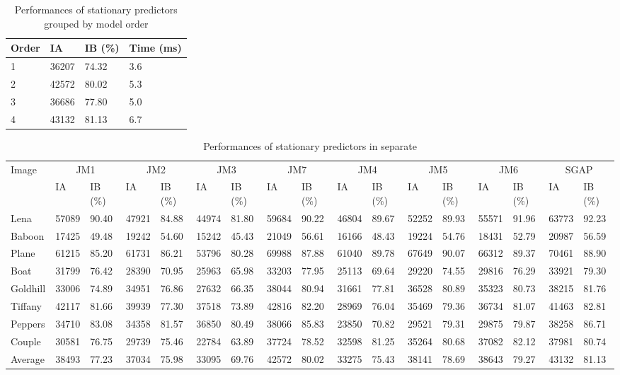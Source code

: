 \documentclass[journal]{IEEEtran}
\begin{document}
\begin{table}
    \caption{\label{tbl:spo}Performances of stationary predictors grouped by model order}
    \centering
    \begin{tabular}{llll}\hline\hline
	Order & IA & IB (\%) & Time (ms) \\\hline
	1 & 36207 & 74.32 & 3.6 \\
	2 & 42572 & 80.02 & 5.3 \\ 
	3 & 36686 & 77.80 & 5.0 \\
	4 & 43132 & 81.13 & 6.7 \\\hline\hline
    \end{tabular}
\end{table}

\begin{table*}
    \caption{\label{tbl:spt}Performances of stationary predictors in separate}
    \setlength{\tabcolsep}{1.5mm}
    \begin{tabular}{lllllllllllllllll}\hline\hline
	Image & \multicolumn{2}{c}{JM1} & \multicolumn{2}{c}{JM2} & \multicolumn{2}{c}{JM3} & \multicolumn{2}{c}{JM7} & \multicolumn{2}{c}{JM4} & \multicolumn{2}{c}{JM5} & \multicolumn{2}{c}{JM6} & \multicolumn{2}{c}{SGAP} \\\cline{2-17}
	& IA	&  IB (\%) 	& IA	& IB (\%)	& IA	& IB (\%)	& IA	& IB (\%)	& IA	& IB (\%)	& IA 	& IB (\%)	& IA	& IB (\%)	& IA 	& IB (\%) \\\hline
	Lena 	& 57089 & 90.40 & 47921 & 84.88 & 44974 & 81.80 & 59684 & 90.22 & 46804 & 89.67 & 52252 & 89.93 & 55571 & 91.96 & 63773 & 92.23 \\
 	Baboon 	& 17425 & 49.48 & 19242 & 54.60 & 15242 & 45.43 & 21049 & 56.61 & 16166 & 48.43 & 19224 & 54.76 & 18431 & 52.79 & 20987 & 56.59 \\
 	Plane	& 61215 & 85.20 & 61731 & 86.21 & 53796 & 80.28 & 69988 & 87.88 & 61040 & 89.78 & 67649 & 90.07 & 66312 & 89.37 & 70461 & 88.90 \\
 	Boat	& 31799 & 76.42 & 28390 & 70.95 & 25963 & 65.98 & 33203 & 77.95 & 25113 & 69.64 & 29220 & 74.55 & 29816 & 76.29 & 33921 & 79.30 \\
 	Goldhill& 33006 & 74.89 & 34951 & 76.86 & 27632 & 66.35 & 38044 & 80.94 & 31661 & 77.81 & 36528 & 80.89 & 35323 & 80.73 & 38215 & 81.76 \\
 	Tiffany	& 42117 & 81.66 & 39939 & 77.30 & 37518 & 73.89 & 42816 & 82.20 & 28969 & 76.04 & 35469 & 79.36 & 36734 & 81.07 & 41463 & 82.81 \\
 	Peppers	& 34710 & 83.08 & 34358 & 81.57 & 36850 & 80.49 & 38066 & 85.83 & 23850 & 70.82 & 29521 & 79.31 & 29875 & 79.87 & 38258 & 86.71 \\
 	Couple	& 30581 & 76.75 & 29739 & 75.46 & 22784 & 63.89 & 37724 & 78.52 & 32598 & 81.25 & 35264 & 80.68 & 37082 & 82.12 & 37981 & 80.74 \\
	Average	& 38493 & 77.23 & 37034 & 75.98 & 33095 & 69.76 & 42572 & 80.02 & 33275 & 75.43 & 38141 & 78.69 & 38643 & 79.27 & 43132 & 81.13 \\\hline\hline
    \end{tabular}
\end{table*}
\end{document}
